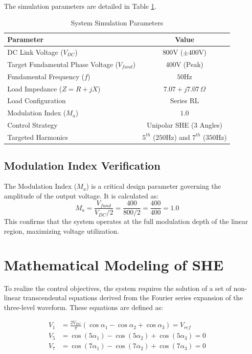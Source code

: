 \documentclass[12pt, a4paper]{article}
\begin{document}
	The simulation parameters are detailed in Table \ref{tab:params}.
	
	\begin{table}[H]
		\centering
		\caption{System Simulation Parameters}
		\label{tab:params}
		\begin{tabular}{lc}
			\toprule
			\textbf{Parameter} & \textbf{Value} \\
			\midrule
			DC Link Voltage ($V_{DC}$) & $800\text{V}$ ($\pm 400\text{V}$) \\
			Target Fundamental Phase Voltage ($V_{fund}$) & $400\text{V}$ (Peak) \\
			Fundamental Frequency ($f$) & $50\text{Hz}$ \\
			Load Impedance ($Z = R + jX$) & $7.07 + j7.07\,\Omega$ \\
			Load Configuration & Series RL \\
			Modulation Index ($M_a$) & $1.0$ \\
			Control Strategy & Unipolar SHE (3 Angles) \\
			Targeted Harmonics & $5^{th}$ ($250\text{Hz}$) and $7^{th}$ ($350\text{Hz}$) \\
			\bottomrule
		\end{tabular}
	\end{table}
	
	\subsection{Modulation Index Verification}
	The Modulation Index ($M_a$) is a critical design parameter governing the amplitude of the output voltage. It is calculated as:
	\begin{equation}
		M_a = \frac{V_{fund}}{V_{DC}/2} = \frac{400}{800/2} = \frac{400}{400} = 1.0
	\end{equation}
	This confirms that the system operates at the full modulation depth of the linear region, maximizing voltage utilization.
	
	\section{Mathematical Modeling of SHE}
	To realize the control objectives, the system requires the solution of a set of non-linear transcendental equations derived from the Fourier series expansion of the three-level waveform. These equations are defined as:
	
	\begin{align}
		V_1 &= \frac{2 V_{DC}}{\pi} (\cos\alpha_1 - \cos\alpha_2 + \cos\alpha_3) = V_{ref} \\
		V_5 &= \cos(5\alpha_1) - \cos(5\alpha_2) + \cos(5\alpha_3) = 0 \\
		V_7 &= \cos(7\alpha_1) - \cos(7\alpha_2) + \cos(7\alpha_3) = 0
	\end{align}
	
\end{document}
